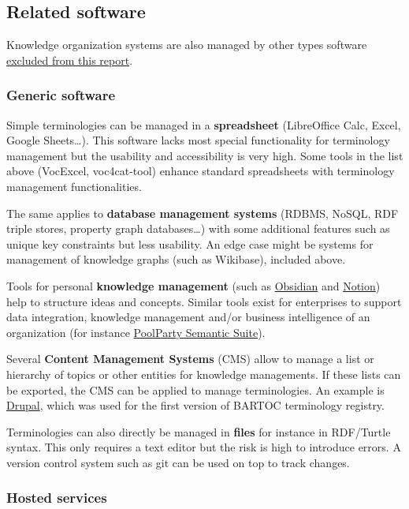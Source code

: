\documentclass[
  DIV=10]{article}
\begin{document}
\subsection{Related software}\label{related-software}

Knowledge organization systems are also managed by other types software
\hyperref[scope]{excluded from this report}.

\subsubsection{Generic software}\label{generic-software}

Simple terminologies can be managed in a \textbf{spreadsheet}
(LibreOffice Calc, Excel, Google Sheets\ldots). This software lacks most
special functionality for terminology management but the usability and
accessibility is very high. Some tools in the list above (VocExcel,
voc4cat-tool) enhance standard spreadsheets with terminology management
functionalities.

The same applies to \textbf{database management systems} (RDBMS, NoSQL,
RDF triple stores, property graph databases\ldots) with some additional
features such as unique key constraints but less usability. An edge case
might be systems for management of knowledge graphs (such as Wikibase),
included above.

Tools for personal \textbf{knowledge management} (such as
\href{https://obsidian.md/}{Obsidian} and
\href{https://www.notion.com/}{Notion}) help to structure ideas and
concepts. Similar tools exist for enterprises to support data
integration, knowledge management and/or business intelligence of an
organization (for instance
\href{https://www.poolparty.biz/product-overview}{PoolParty Semantic
Suite}).

Several \textbf{Content Management Systems} (CMS) allow to manage a list
or hierarchy of topics or other entities for knowledge managements. If
these lists can be exported, the CMS can be applied to manage
terminologies. An example is \href{https://www.drupal.org/}{Drupal},
which was used for the first version of BARTOC terminology registry.

Terminologies can also directly be managed in \textbf{files} for
instance in RDF/Turtle syntax. This only requires a text editor but the
risk is high to introduce errors. A version control system such as git
can be used on top to track changes.

\subsubsection{Hosted services}\label{hosted-services}
\end{document}
